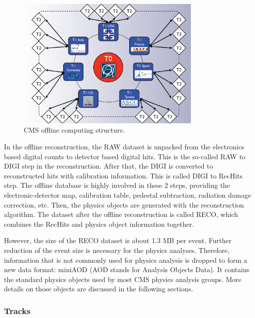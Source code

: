 \begin{figure}[htbp]
 \begin{center}
  \includegraphics[width=0.8\textwidth]{figures/c3/c3_cms_tiers.png}
 \end{center}
 \caption{CMS offline computing structure.}
 \label{fig:c3cmstiers}
\end{figure}

In the offline reconstruction, the RAW dataset is unpacked from the electronics based digital counts to detector based digital hits. This is the so-called RAW to DIGI step in the reconstruction. After that, the DIGI is converted to reconstructed hits with calibration information. This is called DIGI to RecHits step. The offline database is highly involved in these 2 steps, providing the electronic-detector map, calibration table, pedestal subtraction, radiation damage correction, etc. Then, the physics objects are generated with the reconstruction algorithm. The dataset after the offline reconstruction is called RECO, which combines the RecHits and physics object information together. 

However, the size of the RECO dataset is about 1.3 MB per event. Further reduction of the event size is necessary for the physics analyses. Therefore, information that is not commonly used for physics analysis is dropped to form a new data format: miniAOD (AOD stands for Analysis Objects Data). It contains the standard physics objects used by most CMS physics analysis groups. More details on those objects are discussed in the following sections. 

\subsubsection{Tracks}

